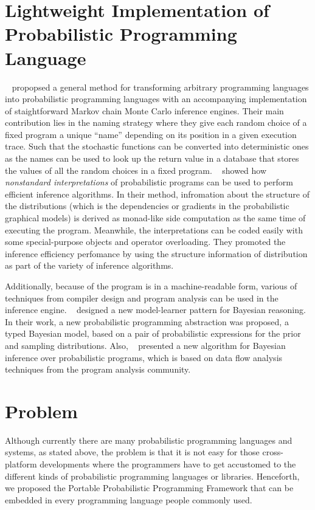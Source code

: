 \section{Lightweight Implementation of Probabilistic Programming Language}
~\cite{lightweight} propopsed a general method for transforming arbitrary programming languages into probabilistic programming languages with an accompanying implementation of staightforward Markov chain Monte Carlo inference engines. Their main contribution lies in the naming strategy where they give each random choice of a fixed program a unique ``name'' depending on its position in a given execution trace. Such that the stochastic functions can be converted into deterministic ones as the names can be used to look up the return value in a database that stores the values of all the random choices in a fixed program. ~\cite{nonstandard} showed how \textit{nonstandard interpretations} of probabilistic programs can be used to perform efficient inference algorithms. In their method, infromation about the structure of the distributions (which is the dependencies or gradients in the probabilistic graphical models) is derived as monad-like side computation as the same time of executing the program. Meanwhile, the interpretations can be coded easily with some special-purpose objects and operator overloading. They promoted the inference efficiency perfomance by using the structure information of distribution as part of the variety of inference algorithms.

Additionally, because of the program is in a machine-readable form, various of techniques from compiler design and program analysis can be used in the inference engine. ~\cite{gordon2013} designed a new model-learner pattern for Bayesian reasoning. In their work, a new probabilistic programming abstraction was proposed, a typed Bayesian model, based on a pair of probabilistic expressions for the prior and sampling distributions. Also, ~\cite{dataflow} presented a new algorithm for Bayesian inference over probabilistic programs, which is based on data flow analysis techniques from the program analysis community.

\section{Problem}
\label{sec:prob}

Although currently there are many probabilistic programming languages and systems, as stated above, the problem is that it is not easy for those cross-platform developments where the programmers have to get accustomed to the different kinds of probabilistic programming languages or libraries. Henceforth, we proposed the Portable Probabilistic Programming Framework that can be embedded in every programming language people commonly used.

